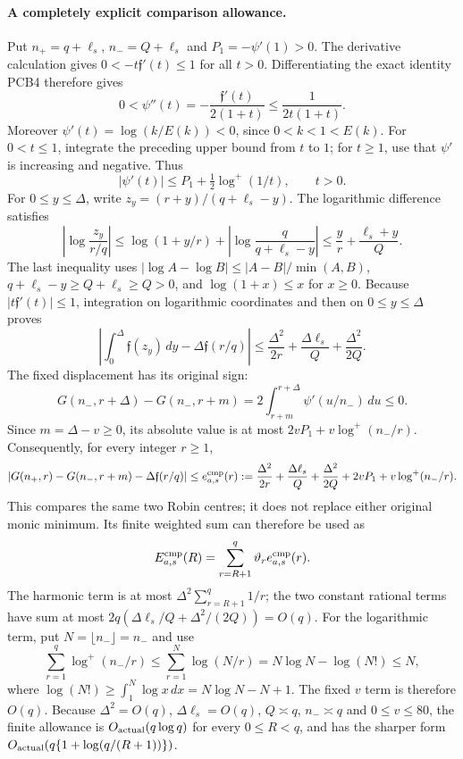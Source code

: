 \documentclass[11pt,a4paper]{article}
\begin{document}
\paragraph{A completely explicit comparison allowance.}
Put $n_+=q+\ell_s$, $n_-=Q+\ell_s$ and
$P_1=-\psi'(1)>0$. The derivative calculation gives
$0<-t\mathfrak f'(t)\le1$ for all $t>0$.
Differentiating the exact identity PCB4 therefore gives
\[
 0<\psi''(t)=-\frac{\mathfrak f'(t)}{2(1+t)}
       \le\frac1{2t(1+t)}.
\]
Moreover $\psi'(t)=\log(k/E(k))<0$, since $0<k<1<E(k)$.
For $0<t\le1$, integrate the preceding upper bound from $t$ to $1$;
for $t\ge1$, use that $\psi'$ is increasing and negative. Thus
\[
 |\psi'(t)|\le P_1+\tfrac12\log^+(1/t),\qquad t>0.
\]
For $0\le y\le\Delta$, write
$z_y=(r+y)/(q+\ell_s-y)$. The logarithmic difference satisfies
\[
 \left|\log\frac{z_y}{r/q}\right|
 \le\log(1+y/r)+
      \left|\log\frac q{q+\ell_s-y}\right|
 \le\frac yr+\frac{\ell_s+y}{Q}.
\]
The last inequality uses
$|\log A-\log B|\le|A-B|/\min(A,B)$,
$q+\ell_s-y\ge Q+\ell_s\ge Q>0$, and
$\log(1+x)\le x$ for $x\ge0$.
Because $|t\mathfrak f'(t)|\le1$, integration on logarithmic coordinates
and then on $0\le y\le\Delta$ proves
\[
 \left|\int_0^\Delta\mathfrak f(z_y)\,dy
                   -\Delta\mathfrak f(r/q)\right|
 \le\frac{\Delta^2}{2r}
       +\frac{\Delta\ell_s}{Q}+\frac{\Delta^2}{2Q}.
\]
The fixed displacement has its original sign:
\[
 G(n_-,r+\Delta)-G(n_-,r+m)
       =2\int_{r+m}^{r+\Delta}\psi'(u/n_-)\,du\le0.
\]
Since $m=\Delta-v\ge0$, its absolute value is at most
$2vP_1+v\log^+(n_-/r)$. Consequently, for every integer $r\ge1$,
\[
 \left|G(n_+,r)-G(n_-,r+m)-\Delta\mathfrak f(r/q)\right|
 \le e^{\rm cmp}_{a,s}(r):=
 \frac{\Delta^2}{2r}+\frac{\Delta\ell_s}{Q}
       +\frac{\Delta^2}{2Q}+2vP_1+v\log^+(n_-/r).
\]
This compares the same two Robin centres; it does not replace either
original monic minimum. Its finite weighted sum can therefore be used as
\[
 E^{\rm cmp}_{a,s}(R)
    =\sum_{r=R+1}^{q}\vartheta_r e^{\rm cmp}_{a,s}(r).
\]
The harmonic term is at most
$\Delta^2\sum_{r=R+1}^{q}1/r$; the two constant rational terms have
sum at most $2q(\Delta\ell_s/Q+\Delta^2/(2Q))=O(q)$.
For the logarithmic term, put $N=\lfloor n_-\rfloor=n_-$ and use
\[
 \sum_{r=1}^{q}\log^+(n_-/r)
 \le\sum_{r=1}^{N}\log(N/r)
       =N\log N-\log(N!)\le N,
\]
where $\log(N!)\ge\int_1^N\log x\,dx=N\log N-N+1$.
The fixed $v$ term is therefore $O(q)$.
Because $\Delta^2=O(q)$, $\Delta\ell_s=O(q)$, $Q\asymp q$,
$n_-\asymp q$ and $0\le v\le80$, the finite allowance is
$O_{\rm actual}(q\log q)$ for every $0\le R<q$,
and has the sharper form $O_{\rm actual}(q\{1+\log(q/(R+1))\})$.
\end{document}
